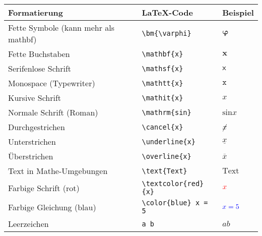 \begin{table}[H]
    \centering
    \renewcommand{\arraystretch}{1.3}
    \begin{tabular}{lll}
        \toprule
        \textbf{Formatierung}                & \textbf{LaTeX-Code}                                 & \textbf{Beispiel}        \\
        \midrule
        Fette Symbole (kann mehr als mathbf) & \texttt{\textbackslash bm\{\textbackslash varphi\}} & \( \bm{\varphi} \)       \\
        Fette Buchstaben                     & \texttt{\textbackslash mathbf\{x\}}                 & \( \mathbf{x} \)         \\
        Serifenlose Schrift                  & \texttt{\textbackslash mathsf\{x\}}                 & \( \mathsf{x} \)         \\
        Monospace (Typewriter)               & \texttt{\textbackslash mathtt\{x\}}                 & \( \mathtt{x} \)         \\
        Kursive Schrift                      & \texttt{\textbackslash mathit\{x\}}                 & \( \mathit{x} \)         \\
        Normale Schrift (Roman)              & \texttt{\textbackslash mathrm\{sin\}}               & \( \mathrm{sin} x \)     \\
        \midrule
        Durchgestrichen                      & \texttt{\textbackslash cancel\{x\}}                 & \( \cancel{x} \)         \\
        Unterstrichen                        & \texttt{\textbackslash underline\{x\}}              & \( \underline{x} \)      \\
        Überstrichen                         & \texttt{\textbackslash overline\{x\}}               & \( \overline{x} \)       \\
        \midrule
        Text in Mathe-Umgebungen             & \texttt{\textbackslash text\{Text\}}                & \( \text{Text} \)        \\
        \midrule
        Farbige Schrift (rot)                & \texttt{\textbackslash textcolor\{red\}\{x\}}       & \( \textcolor{red}{x} \) \\
        Farbige Gleichung (blau)             & \texttt{\textbackslash color\{blue\} x = 5}         & \( \color{blue} x = 5 \) \\
        \midrule
        Leerzeichen                          & \texttt{a b}                                        & \( a  b \)               \\

\end{tabular}
\end{table}
